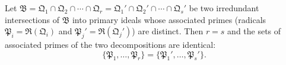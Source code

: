 Let $\mathfrak{B} = \mathfrak{Q}_1 \cap \mathfrak{Q}_2 \cap \cdots \cap \mathfrak{Q}_r = \mathfrak{Q}_1' \cap \mathfrak{Q}_2' \cap \cdots \cap \mathfrak{Q}_s'$ be two irredundant intersections of $\mathfrak{B}$ into primary ideals whose associated primes (radicals $\mathfrak{P}_i = \mathfrak{R}(\mathfrak{Q}_i)$ and $\mathfrak{P}_j' = \mathfrak{R}(\mathfrak{Q}_j')$) are distinct. Then $r = s$ and the sets of associated primes of the two decompositions are identical:
$$\{\mathfrak{P}_1, \dots, \mathfrak{P}_r\} = \{\mathfrak{P}_1', \dots, \mathfrak{P}_s'\}.$$
